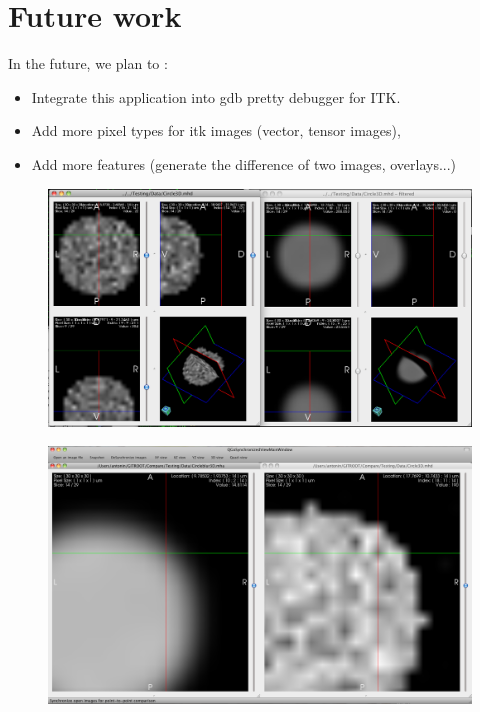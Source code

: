 \documentclass{InsightArticle}
\begin{document}
\section{Future work}
In the future, we plan to :
\begin{itemize}
  \item Integrate this application into gdb pretty debugger for ITK.
  \item Add more pixel types for itk images (vector, tensor images),
  \item Add more features (generate the difference of two images, overlays...)
\end{itemize}

\begin{figure}[p]
\center
\includegraphics[width=1\textwidth]{images/quadcompare}
\label{fig:ImageCompareGUIquad}
\end{figure}

\begin{figure}[p]
\center
\includegraphics[width=1\textwidth]{images/xycompare}
\label{fig:ImageCompareGUIXY}
\end{figure}

\clearpage



\end{document}
